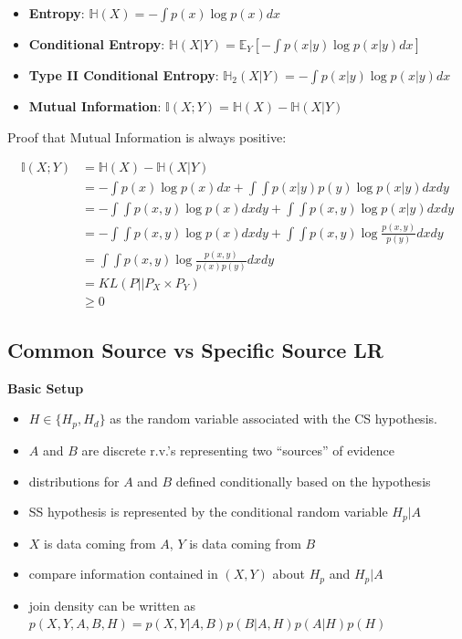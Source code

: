 \documentclass[]{book}
\providecommand{\tightlist}{%
  \setlength{\itemsep}{0pt}\setlength{\parskip}{0pt}}
\begin{document}
\begin{itemize}
\tightlist
\item
  \textbf{Entropy}: \(\mathbb{H}(X) = -\int{p(x) \log p(x) dx}\)
\item
  \textbf{Conditional Entropy}: \(\mathbb{H}(X|Y) = \mathbb{E}_{Y}\left[-\int{p(x|y) \log p(x|y) dx}\right]\)
\item
  \textbf{Type II Conditional Entropy}: \(\mathbb{H}_{2}(X|Y) = -\int{p(x|y) \log p(x|y) dx}\)
\item
  \textbf{Mutual Information}: \(\mathbb{I}(X;Y) = \mathbb{H}(X) - \mathbb{H}(X|Y)\)
\end{itemize}

Proof that Mutual Information is always positive:

\begin{align*}
\mathbb{I}(X;Y) &= \mathbb{H}(X) - \mathbb{H}(X|Y) \\
&= -\int{p(x) \log p(x) dx} + \int{\int{p(x|y)p(y) \log p(x|y) dx} dy} \\
&= -\int{\int{p(x,y) \log p(x) dx}dy} + \int{\int{p(x,y) \log p(x|y) dx} dy} \\
&= -\int{\int{p(x,y) \log p(x) dx}dy} + \int{\int{p(x,y) \log \frac{p(x,y)}{p(y)} dx} dy} \\
&= \int{\int{p(x,y) \log \frac{p(x,y)}{p(x)p(y)} dx}dy} \\
&= KL(P||P_{X} \times P_{Y}) \\
&\geq 0
\end{align*}

\hypertarget{common-source-vs-specific-source-lr}{%
\subsection{Common Source vs Specific Source LR}\label{common-source-vs-specific-source-lr}}

\textbf{Basic Setup}

\begin{itemize}
\tightlist
\item
  \(H \in \{ H_p, H_d \}\) as the random variable associated with the CS hypothesis.
\item
  \(A\) and \(B\) are discrete r.v.'s representing two ``sources'' of evidence
\item
  distributions for \(A\) and \(B\) defined conditionally based on the hypothesis
\item
  SS hypothesis is represented by the conditional random variable \(H_p|A\)
\item
  \(X\) is data coming from \(A\), \(Y\) is data coming from \(B\)
\item
  compare information contained in \((X,Y)\) about \(H_p\) and \(H_p|A\)
\item
  join density can be written as \(p(X,Y,A,B,H) = p(X,Y|A,B)p(B|A,H)p(A|H)p(H)\)
\end{itemize}
\end{document}
